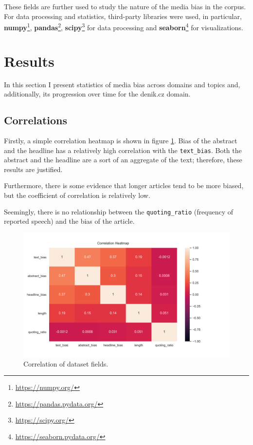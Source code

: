 These fields are further used to study the nature of the media bias in the corpus.
For data processing and statistics, third-party libraries were used, in particular, \textbf{numpy}\footnote{\url{https://numpy.org/}}, \textbf{pandas}\footnote{\url{https://pandas.pydata.org/}}, \textbf{scipy}\footnote{\url{https://scipy.org/}} for data processing and \textbf{seaborn}\footnote{\url{https://seaborn.pydata.org/}} for visualizations.


\section{Results}
In this section I present statistics of media bias across domains and topics and, additionally, its progression over time for the denik.cz domain.

\subsection{Correlations}
Firstly, a simple correlation heatmap is shown in figure \ref{fig:corr}. Bias of the abstract and the headline has a relatively high correlation with the \verb|text_bias|. Both the abstract and the headline are a sort of an aggregate of the text; therefore, these results are justified.

Furthermore, there is some evidence that longer articles tend to be more biased, but the coefficient of correlation is relatively low.

Seemingly, there is no relationship between the \verb|quoting_ratio| (frequency of reported speech)
and the bias of the article.

\begin{figure}

  \includegraphics[scale=0.5]{my_modules/multimedia/inference/corr.png}
  \caption{Correlation of dataset fields.}
  \label{fig:corr}

\end{figure}


